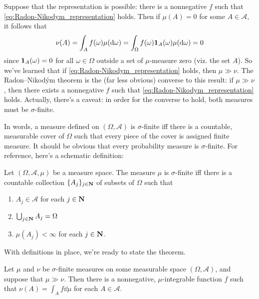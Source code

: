 \documentclass[11pt,letterpaper,reqno,oneside]{article}
\begin{document}
Suppose that the representation is possible: there is a nonnegative $f$ such that \eqref{eq:Radon-Nikodym_representation} holds. Then if $\mu(A)=0$ for some $A \in \mathcal{A}$, it follows that
%
\begin{equation*}
	\nu(A) 
	= \int_A f(\omega) \mu( \mathrm{d} \omega )
	= \int_\Omega f(\omega) \boldsymbol{1}_A(\omega) \mu( \mathrm{d} \omega )
	= 0
\end{equation*}
%
since $\boldsymbol{1}_A(\omega)=0$ for all $\omega \in \Omega$ outside a set of $\mu$-measure zero (viz. the set $A$). So we've learned that if \eqref{eq:Radon-Nikodym_representation} holds, then $\mu \gg \nu$. The Radon--Nikod\'{y}m theorem is the (far less obvious) converse to this result: if $\mu \gg \nu$, then there exists a nonnegative $f$ such that \eqref{eq:Radon-Nikodym_representation} holds. Actually, there's a caveat: in order for the converse to hold, both measures must be $\sigma$-finite.

In words, a measure defined on $(\Omega,\mathcal{A})$ is $\sigma$-finite iff there is a countable, measurable cover of $\Omega$ such that every piece of the cover is assigned finite measure. It should be obvious that every probability measure is $\sigma$-finite. For reference, here's a schematic definition:
%
\begin{definition}
	Let $(\Omega,\mathcal{A},\mu)$ be a measure space. The measure $\mu$ is $\sigma$-finite iff there is a countable collection $\{ A_j \}_{j \in \mathbf{N}}$ of subsets of $\Omega$ such that

	\begin{enumerate}

		\item $A_j \in \mathcal{A}$ for each $j \in \mathbf{N}$

		\item $\bigcup_{j \in \mathbf{N}} A_j = \Omega$

		\item $\mu(A_j)<\infty$ for each $j \in \mathbf{N}$.

	\end{enumerate}
\end{definition}


With definitions in place, we're ready to state the theorem.

\begin{theorem}
	Let $\mu$ and $\nu$ be $\sigma$-finite measures on some measurable space $(\Omega,\mathcal{A})$, and suppose that $\mu \gg \nu$. Then there is a nonnegative, $\mu$-integrable function $f$ such that $\nu(A) = \int_A f \dd \mu$ for each $A \in \mathcal{A}$.
\end{theorem}
\end{document}
